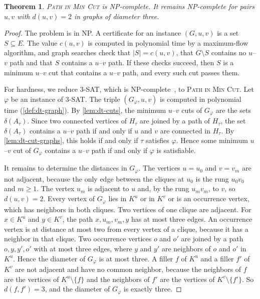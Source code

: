 \documentclass[pdflatex,sn-mathphys-num]{sn-jnl}%
\theoremstyle{thmstyleone}%
\newtheorem{theorem}{Theorem}%
\theoremstyle{thmstyletwo}%
\theoremstyle{thmstylethree}%
\newcommand{\PathInMinCut}{\textsc{Path in Min Cut}}%
\begin{document}
\begin{theorem}
\label{thm:dt-hardness}
\PathInMinCut{} is NP-complete.
It remains NP-complete for pairs $u, v$ with $d(u, v) = 2$ in graphs of diameter three.
\end{theorem}

\begin{proof}
The problem is in NP.
A certificate for an instance $(G, u, v)$ is a set $S \subseteq E$.
The value $c(u, v)$ is computed in polynomial time by a maximum-flow algorithm, and graph searches check that $|S| = c(u, v)$, that $G \setminus S$ contains no $u$--$v$ path and that $S$ contains a $u$--$v$ path.
If these checks succeed, then $S$ is a minimum $u$--$v$ cut that contains a $u$--$v$ path, and every such cut passes them.

For hardness, we reduce 3-SAT, which is NP-complete~\cite{Cook1971Complexity,Karp1972Reducibility}, to \PathInMinCut{}.
Let $\varphi$ be an instance of 3-SAT.
The triple $(G_\varphi, u, v)$ is computed in polynomial time (\cref{def:dt-graph}).
By \cref{lem:dt-cuts}, the minimum $u$--$v$ cuts of $G_\varphi$ are the sets $\delta(A_\tau)$.
Since two connected vertices of $H_\tau$ are joined by a path of $H_\tau$, the set $\delta(A_\tau)$ contains a $u$--$v$ path if and only if $u$ and $v$ are connected in $H_\tau$.
By \cref{lem:dt-cut-graphs}, this holds if and only if $\tau$ satisfies $\varphi$.
Hence some minimum $u$--$v$ cut of $G_\varphi$ contains a $u$--$v$ path if and only if $\varphi$ is satisfiable.

It remains to determine the distances in $G_\varphi$.
The vertices $u = u_0$ and $v = v_m$ are not adjacent, because the only edge between the cliques at $u_0$ is the rung $u_0 v_0$ and $m \geq 1$.
The vertex $u_m$ is adjacent to $u$ and, by the rung $u_m v_m$, to $v$, so $d(u, v) = 2$.
Every vertex of $G_\varphi$ lies in $K^u$ or in $K^v$ or is an occurrence vertex, which has neighbors in both cliques.
Two vertices of one clique are adjacent.
For $x \in K^u$ and $y \in K^v$, the path $x, u_m, v_m, y$ has at most three edges.
An occurrence vertex is at distance at most two from every vertex of a clique, because it has a neighbor in that clique.
Two occurrence vertices $o$ and $o'$ are joined by a path $o, y, y', o'$ with at most three edges, where $y$ and $y'$ are neighbors of $o$ and $o'$ in $K^u$.
Hence the diameter of $G_\varphi$ is at most three.
A filler $f$ of $K^u$ and a filler $f'$ of $K^v$ are not adjacent and have no common neighbor, because the neighbors of $f$ are the vertices of $K^u \setminus \{f\}$ and the neighbors of $f'$ are the vertices of $K^v \setminus \{f'\}$.
So $d(f, f') = 3$, and the diameter of $G_\varphi$ is exactly three.
\end{proof}
\end{document}
